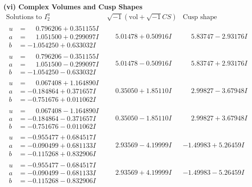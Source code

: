 \documentclass[1p]{elsarticle_modified}
\theoremstyle{definition}
\newcommand{\I}{\sqrt{-1}}
\begin{document}
\newpage\flushleft \textbf{(vi) Complex Volumes and Cusp Shapes}
$$\begin{array}{c|c|c}  
\text{Solutions to }I^u_{2}& \I (\text{vol} + \sqrt{-1}CS) & \text{Cusp shape}\\
 \hline 
\begin{aligned}
u &= \phantom{-}0.796206 + 0.351155 I \\
a &= \phantom{-}1.051500 + 0.299097 I \\
b &= -1.054250 + 0.633032 I\end{aligned}
 & \phantom{-}5.01478 + 0.50916 I & \phantom{-}5.83747 - 2.93176 I \\ \hline\begin{aligned}
u &= \phantom{-}0.796206 - 0.351155 I \\
a &= \phantom{-}1.051500 - 0.299097 I \\
b &= -1.054250 - 0.633032 I\end{aligned}
 & \phantom{-}5.01478 - 0.50916 I & \phantom{-}5.83747 + 2.93176 I \\ \hline\begin{aligned}
u &= \phantom{-}0.067408 + 1.164890 I \\
a &= -0.184864 + 0.371657 I \\
b &= -0.751676 + 0.011062 I\end{aligned}
 & \phantom{-}0.35050 + 1.85110 I & \phantom{-}2.99827 - 3.67948 I \\ \hline\begin{aligned}
u &= \phantom{-}0.067408 - 1.164890 I \\
a &= -0.184864 - 0.371657 I \\
b &= -0.751676 - 0.011062 I\end{aligned}
 & \phantom{-}0.35050 - 1.85110 I & \phantom{-}2.99827 + 3.67948 I \\ \hline\begin{aligned}
u &= -0.955477 + 0.684517 I \\
a &= -0.090499 + 0.681133 I \\
b &= -0.115268 + 0.832906 I\end{aligned}
 & \phantom{-}2.93569 - 4.19999 I & -1.49983 + 5.26459 I \\ \hline\begin{aligned}
u &= -0.955477 - 0.684517 I \\
a &= -0.090499 - 0.681133 I \\
b &= -0.115268 - 0.832906 I\end{aligned}
 & \phantom{-}2.93569 + 4.19999 I & -1.49983 - 5.26459 I \\ \hline\begin{aligned}

\end{aligned}
\end{array}$$
\end{document}
